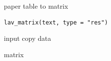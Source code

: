 \documentclass[a4paper]{book}
\begin{document}
%
\begin{Description}
paper table to matrix
\end{Description}
%
\begin{Usage}
\begin{verbatim}
lav_matrix(text, type = "res")
\end{verbatim}
\end{Usage}
%
\begin{Arguments}
\begin{ldescription}
\item[\code{text}] input copy data
\end{ldescription}
\end{Arguments}
%
\begin{Value}
matrix
\end{Value}
%
\end{document}
